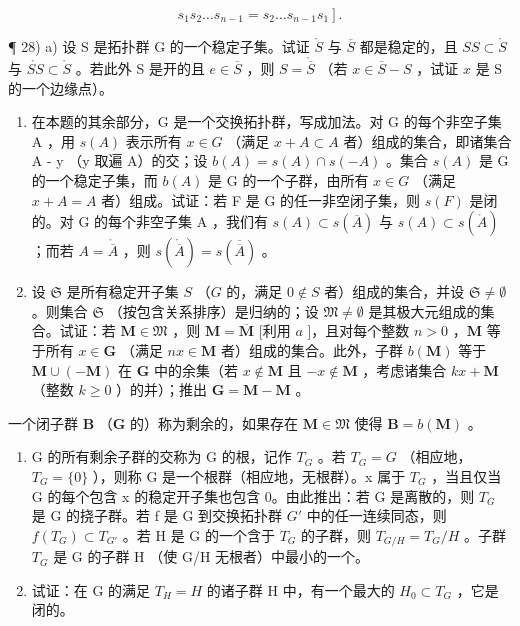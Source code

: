 \[
\left. s _ {1} s _ {2} \dots s _ {n - 1} = s _ {2} \dots s _ {n - 1} s _ {1} \right].
\]

¶ 28) a) 设 S 是拓扑群 G 的一个稳定子集。试证 \(\mathring{S}\) 与 \(\overline{S}\) 都是稳定的，且 \(SS\subset\mathring{S}\) 与 \(\mathring{SS}\subset\mathring{S}\) 。若此外 S 是开的且 \(e\in\overline{S}\) ，则 \(S=\mathring{\overline{S}}\) （若 \(x\in\overline{S}-S\) ，试证 \(x\) 是 S 的一个边缘点）。

\begin{enumerate}
\def\labelenumi{\alph{enumi})}
\setcounter{enumi}{1}
\item
  在本题的其余部分，G 是一个交换拓扑群，写成加法。对 G 的每个非空子集 A ，用 \(s(A)\) 表示所有 \(x \in G\) （满足 \(x + A \subset A\) 者）组成的集合，即诸集合 A - y （y 取遍 A）的交；设 \(b(A) = s(A) \cap s(-A)\) 。集合 \(s(A)\) 是 G 的一个稳定子集，而 \(b(A)\) 是 G 的一个子群，由所有 \(x \in G\) （满足 \(x + A = A\) 者）组成。试证：若 F 是 G 的任一非空闭子集，则 \(s(F)\) 是闭的。对 G 的每个非空子集 A ，我们有 \(s(A) \subset s(\overline{A})\) 与 \(s(A) \subset s(\mathring{A})\) ；而若 \(A = \mathring{\overline{A}}\) ，则 \(s(\mathring{\overline{A}}) = s(\overline{\overline{A}})\) 。
\item
  设 \(\mathfrak{S}\) 是所有稳定开子集 \(S\) （\(G\) 的，满足 \(0 \notin S\) 者）组成的集合，并设 \(\mathfrak{S} \neq \emptyset\) 。则集合 \(\mathfrak{S}\) （按包含关系排序）是归纳的；设 \(\mathfrak{M} \neq \emptyset\) 是其极大元组成的集合。试证：若 \(\mathbf{M} \in \mathfrak{M}\) ，则 \(\mathbf{M} = \overline{\mathbf{M}}\) {[}利用 \(a\) {]}，且对每个整数 \(n > 0\) ，\(\mathbf{M}\) 等于所有 \(x \in \mathbf{G}\) （满足 \(nx \in \mathbf{M}\) 者）组成的集合。此外，子群 \(b(\mathbf{M})\) 等于 \(\mathbf{M} \cup (-\mathbf{M})\) 在 \(\mathbf{G}\) 中的余集（若 \(x \notin \mathbf{M}\) 且 \(-x \notin \mathbf{M}\) ，考虑诸集合 \(kx + \mathbf{M}\) （整数 \(k \geqslant 0\) ）的并）；推出 \(\mathbf{G} = \mathbf{M} - \mathbf{M}\) 。
\end{enumerate}

一个闭子群 \(\mathbf{B}\) （\(\mathbf{G}\) 的）称为剩余的，如果存在 \(\mathbf{M} \in \mathfrak{M}\) 使得 \(\mathbf{B} = b(\mathbf{M})\) 。

\begin{enumerate}
\def\labelenumi{\alph{enumi})}
\setcounter{enumi}{3}
\item
  G 的所有剩余子群的交称为 G 的根，记作 \(T_{G}\) 。若 \(T_{G}=G\) （相应地，\(T_{G}=\{0\}\) ），则称 G 是一个根群（相应地，无根群）。x 属于 \(T_{G}\) ，当且仅当 G 的每个包含 x 的稳定开子集也包含 0。由此推出：若 G 是离散的，则 \(T_{G}\) 是 G 的挠子群。若 f 是 G 到交换拓扑群 \(G'\) 中的任一连续同态，则 \(f(T_{G})\subset T_{G'}\) 。若 H 是 G 的一个含于 \(T_{G}\) 的子群，则 \(T_{G/H}=T_{G}/H\) 。子群 \(T_{G}\) 是 G 的子群 H （使 G/H 无根者）中最小的一个。
\item
  试证：在 G 的满足 \(T_{H} = H\) 的诸子群 H 中，有一个最大的 \(H_{0} \subset T_{G}\) ，它是闭的。
\end{enumerate}

